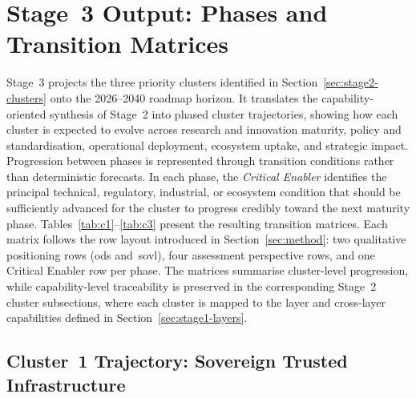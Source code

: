 \documentclass{ieeeaccess}
\begin{document}
\section{Stage~3 Output: Phases and Transition Matrices}
\label{sec:stage3-phases}

Stage~3 projects the three priority clusters identified in Section~\ref{sec:stage2-clusters} onto the 2026--2040 roadmap horizon. It translates the capability-oriented synthesis of Stage~2 into phased cluster trajectories, showing how each cluster is expected to evolve across research and innovation maturity, policy and standardisation, operational deployment, ecosystem uptake, and strategic impact. Progression between phases is represented through transition conditions rather than deterministic forecasts. In each phase, the \emph{Critical Enabler} identifies the principal technical, regulatory, industrial, or ecosystem condition that should be sufficiently advanced for the cluster to progress credibly toward the next maturity phase. Tables~\ref{tab:c1}--\ref{tab:c3} present the resulting transition matrices. Each matrix follows the row layout introduced in Section~\ref{sec:method}: two qualitative positioning rows (\gls{ods} and~\gls{sovl}), four assessment perspective rows, and one Critical Enabler row per phase. The matrices summarise cluster-level progression, while capability-level traceability is preserved in the corresponding Stage~2 cluster subsections, where each cluster is mapped to the layer and cross-layer capabilities defined in Section~\ref{sec:stage1-layers}.

\subsection{Cluster~1 Trajectory: Sovereign Trusted Infrastructure}
\label{subsec:c1traj}
\end{document}
